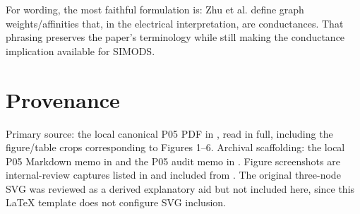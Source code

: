 \documentclass[11pt]{article}
\begin{document}
For wording, the most faithful formulation is: Zhu et al. define graph
weights/affinities that, in the electrical interpretation, are conductances.
That phrasing preserves the paper's terminology while still making the
conductance implication available for SIMODS.

\section*{Provenance}

Primary source: the local canonical P05 PDF in
, read in full, including the figure/table crops corresponding to
Figures 1--6. Archival scaffolding: the local P05 Markdown memo in
 and the P05 audit memo in . Figure
screenshots are internal-review captures listed in
 and included from
. The original three-node SVG was reviewed as a
derived explanatory aid but not included here, since this LaTeX template does
not configure SVG inclusion.



\end{document}
